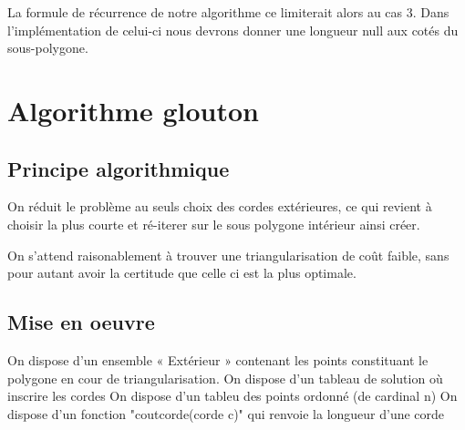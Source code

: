 \documentclass[a4paper,10pt]{article}
\begin{document}
La formule de récurrence de notre algorithme ce limiterait alors au cas 3. Dans l'implémentation de celui-ci nous devrons donner une longueur null aux cotés du sous-polygone. 


\section{Algorithme glouton}


\subsection{Principe algorithmique}

On réduit le problème au seuls choix des cordes extérieures, ce qui revient à choisir la plus courte et ré-iterer sur le sous polygone intérieur ainsi créer.

On s'attend raisonablement à trouver une triangularisation de coût faible, sans pour autant avoir la certitude que celle ci est la plus optimale.

\subsection{Mise en oeuvre}
 

On dispose d'un ensemble « Extérieur » contenant les points constituant le polygone en cour de triangularisation.
On dispose d'un tableau de solution où inscrire les cordes
On dispose d'un tableu des points ordonné (de cardinal n)
On dispose d'un fonction "coutcorde(corde c)" qui renvoie la longueur d'une corde
 
 
 
\end{document}
